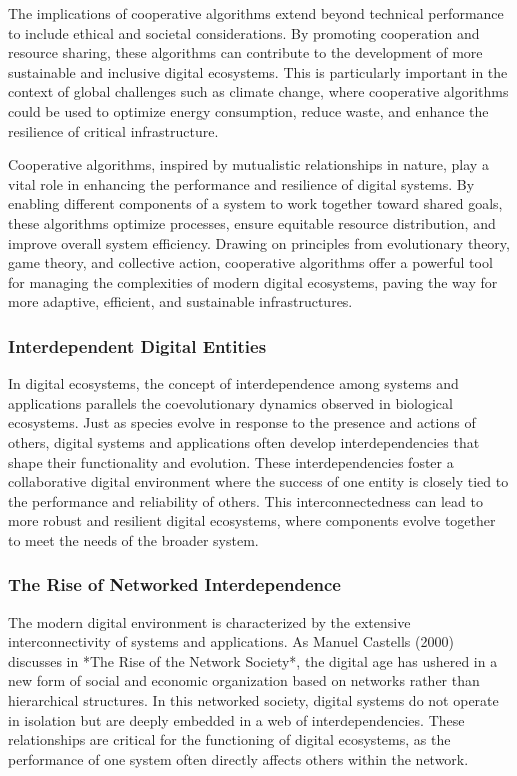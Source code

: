 \documentclass[12pt,twoside]{article}
\begin{document}
The implications of cooperative algorithms extend beyond technical performance to include ethical and societal considerations. By promoting cooperation and resource sharing, these algorithms can contribute to the development of more sustainable and inclusive digital ecosystems. This is particularly important in the context of global challenges such as climate change, where cooperative algorithms could be used to optimize energy consumption, reduce waste, and enhance the resilience of critical infrastructure.

Cooperative algorithms, inspired by mutualistic relationships in nature, play a vital role in enhancing the performance and resilience of digital systems. By enabling different components of a system to work together toward shared goals, these algorithms optimize processes, ensure equitable resource distribution, and improve overall system efficiency. Drawing on principles from evolutionary theory, game theory, and collective action, cooperative algorithms offer a powerful tool for managing the complexities of modern digital ecosystems, paving the way for more adaptive, efficient, and sustainable infrastructures.

\subsubsection{Interdependent Digital Entities}

In digital ecosystems, the concept of interdependence among systems and applications parallels the coevolutionary dynamics observed in biological ecosystems. Just as species evolve in response to the presence and actions of others, digital systems and applications often develop interdependencies that shape their functionality and evolution. These interdependencies foster a collaborative digital environment where the success of one entity is closely tied to the performance and reliability of others. This interconnectedness can lead to more robust and resilient digital ecosystems, where components evolve together to meet the needs of the broader system.

\subsubsection{The Rise of Networked Interdependence}

The modern digital environment is characterized by the extensive interconnectivity of systems and applications. As Manuel Castells (2000) discusses in *The Rise of the Network Society*, the digital age has ushered in a new form of social and economic organization based on networks rather than hierarchical structures. In this networked society, digital systems do not operate in isolation but are deeply embedded in a web of interdependencies. These relationships are critical for the functioning of digital ecosystems, as the performance of one system often directly affects others within the network.
\end{document}

